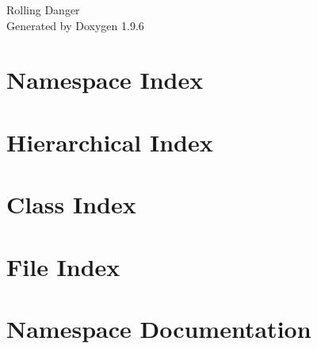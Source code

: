\documentclass[twoside]{book}
\newcommand{\+}{\discretionary{\mbox{\scriptsize$\hookleftarrow$}}{}{}}
\newcommand{\clearemptydoublepage}{%
    \newpage{\pagestyle{empty}\cleardoublepage}%
  }
\begin{document}
  \raggedbottom
    \hypersetup{pageanchor=false,
                bookmarksnumbered=true,
                pdfencoding=unicode
               }
  \begin{titlepage}
  \vspace*{7cm}
  \begin{center}%
  {\Large Rolling Danger}\\
  \vspace*{1cm}
  {\large Generated by Doxygen 1.9.6}\\
  \end{center}
  \end{titlepage}
  \clearemptydoublepage
  \tableofcontents
  \clearemptydoublepage
  \hypersetup{pageanchor=true}
\chapter{Namespace Index}

\chapter{Hierarchical Index}

\chapter{Class Index}

\chapter{File Index}

\chapter{Namespace Documentation}








\end{document}
